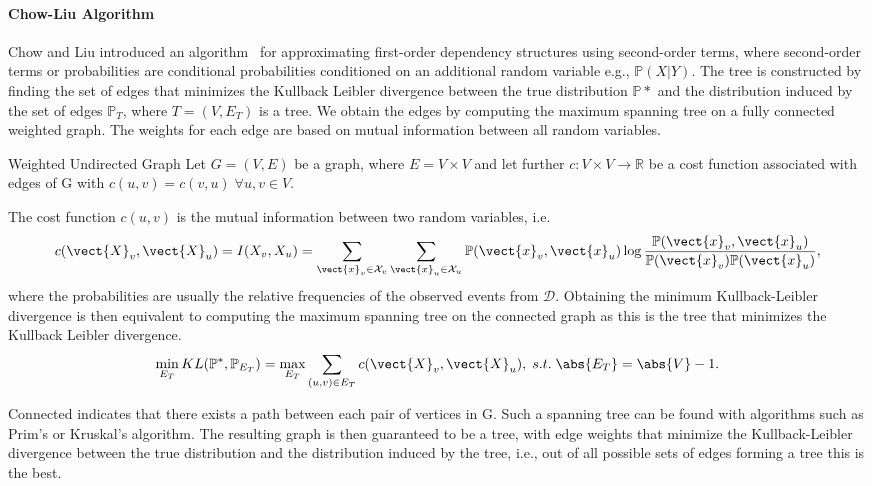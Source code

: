 \paragraph*{Chow-Liu Algorithm}
Chow and Liu introduced an algorithm~\cite{chow1968approximating} for approximating first-order dependency structures using second-order terms, where second-order terms or probabilities are conditional probabilities conditioned on an additional random variable e.g., $\mathbb{P}(X \lvert Y)$.
The tree is constructed by finding the set of edges that minimizes the Kullback Leibler divergence between the true distribution $\mathbb{P}*$ and the distribution induced by the set of edges $\mathbb{P}_T$, where $T=(V, E_T)$ is a tree.
We obtain the edges by computing the maximum spanning tree on a fully connected weighted graph.
The weights for each edge are based on mutual information between all random variables.

\begin{definition}{Weighted Undirected Graph}
    Let $G=(V,E)$ be a graph, where $E = V \times V$ and let further $c: V \times V \rightarrow \mathbb{R}$ be a cost function associated with edges of G with $c(u,v) = c(v,u) \; \forall u,v \in V$.
\end{definition}

The cost function $c(u,v)$ is the mutual information between two random variables, i.e. 
\begin{equation}
    c(\vect{X}_v, \vect{X}_u) = I(X_v, X_u) = \sum_{\vect{x}_v \in \mathcal{X}_v} \sum_{\vect{x}_u \in \mathcal{X}_u} \mathbb{P}(\vect{x}_v,\vect{x}_u) \log \frac{\mathbb{P}(\vect{x}_v,\vect{x}_u) }{\mathbb{P}(\vect{x}_v)  \mathbb{P}(\vect{x}_u)},
\end{equation}
where the probabilities are usually the relative frequencies of the observed events from $\mathcal{D}$.
Obtaining the minimum Kullback-Leibler divergence is then equivalent to computing the maximum spanning tree on the connected graph as this is the tree that minimizes the Kullback Leibler divergence.
\begin{equation}
    \min_{E_T} KL(\mathbb{P}^*, \mathbb{P}_{E_T}) = \max_{E_T} \sum_{(u,v) \in E_T} c(\vect{X}_v, \vect{X}_u), \; s.t. \; \abs{E_T} = \abs{V}-1 .
\end{equation}



Connected indicates that there exists a path between each pair of vertices in G. 
Such a spanning tree can be found with algorithms such as Prim's or Kruskal's algorithm.
The resulting graph is then guaranteed to be a tree, with edge weights that minimize the Kullback-Leibler divergence between the true distribution and the distribution induced by the tree, i.e., out of all possible sets of edges forming a tree this is the best.

